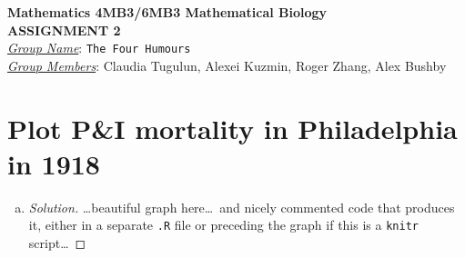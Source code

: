 \documentclass[12pt]{article}
\begin{document}


\begin{center}
{\bf Mathematics 4MB3/6MB3 Mathematical Biology\\
 ASSIGNMENT 2}\\
\medskip
\underline{\emph{Group Name}}: \texttt{{\color{blue}The Four Humours}}\\
\medskip
\underline{\emph{Group Members}}: {\color{blue}Claudia Tugulun, Alexei Kuzmin, Roger Zhang, Alex Bushby}
\end{center}

\section{Plot P\&I mortality in Philadelphia in 1918}

\begin{enumerate}[(a)]

\begin{Schunk}
\begin{Sinput}
> datafile <- "pim_us_phila_city_1918_dy.csv"
> philadata <- read.csv(datafile)
> philadata$date <- as.Date(philadata$date)
> ##install.packages("tidyverse")
> ##install.packages("readr")
> ##install.packages("dplyr")
> ##install.packages("tidyr")
> library(tidyverse)
> library(readr)
> theme_set(theme_bw())
> library(dplyr)
> library(tidyr)
> library()
> gg1<- (ggplot(philadata, aes(x=date, y = pim)) + 
+          geom_line() + 
+          geom_point(colour = "black", fill = "red", shape = 21) + 
+          labs(x = "Date", y = "P & I Deaths")
+ )
> gg1
> pdf("images/plot1.pdf")
> dev.off()
\end{Sinput}
\begin{Soutput}
pdf 
  2 
\end{Soutput}
\end{Schunk}

\begin{figure}
\begin{center}
\texttt{[image: images/plot1.pdf]}
\end{center}
\end{figure}


\PhilaDataReadB

\item \PhilaDataReproduceA

  {\color{blue} \begin{proof}[Solution]
  {\color{magenta}\dots beautiful graph here\dots\ and nicely commented code that produces it, either in a separate \texttt{.R} file or preceding the graph if this is a \texttt{knitr} script\dots}
  \end{proof}
  }

\PhilaDataReproduceB

\end{enumerate}
\end{document}
